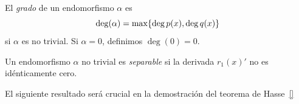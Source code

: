 \begin{definicion}
	El \emph{grado} de un endomorfismo $\alpha$ es
	$$
		\deg(\alpha)= \max \{ \deg p(x) , \deg q(x) \}
	$$
	si $\alpha$ es no trivial. Si $\alpha = 0$, definimos $\deg(0) = 0$.
\end{definicion}

\begin{definicion}
	Un endomorfismo $\alpha$ no trivial es \emph{separable} si la derivada $r_1(x)'$ no es idénticamente cero.

\end{definicion}

El siguiente resultado será crucial en la demostración del teorema de Hasse~\ref{}


